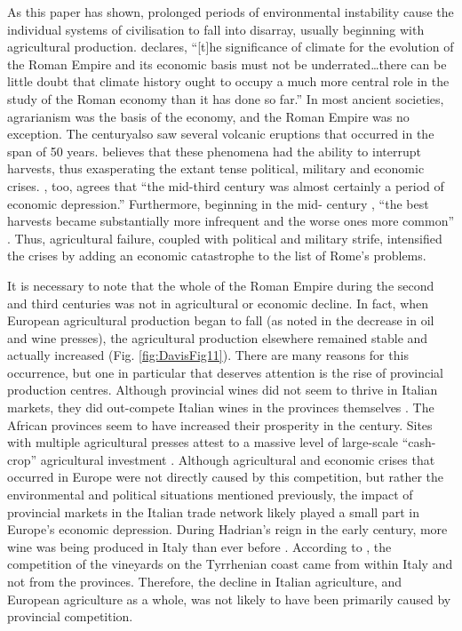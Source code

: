 As this paper has shown, prolonged periods of environmental instability cause the individual systems of civilisation to fall into disarray, usually beginning with agricultural production. \textcite[12]{Scheidel_2012} declares, “[t]he significance of climate for the evolution of the Roman Empire and its economic basis must not be underrated…there can be little doubt that climate history ought to occupy a much more central role in the study of the Roman economy than it has done so far.” In most ancient societies, agrarianism was the basis of the economy, and the Roman Empire was no exception. The  century\AD also saw several volcanic eruptions that occurred in the span of 50 years. \textcite[186]{McCormick_2012} believes that these phenomena had the ability to interrupt harvests, thus exasperating the extant tense political, military and economic crises. \textcite[123]{Hopkins_1980}, too, agrees that “the mid-third century was almost certainly a period of economic depression.” Furthermore, beginning in the mid- century \AD, “the best harvests became substantially more infrequent and the worse ones more common” \parencite[189]{McCormick_2012}. Thus, agricultural failure, coupled with political and military strife, intensified the crises by adding an economic catastrophe to the list of Rome’s problems. 

It is necessary to note that the whole of the Roman Empire during the second and third centuries was not in agricultural or economic decline. In fact, when European agricultural production began to fall (as noted in the decrease in oil and wine presses), the agricultural production elsewhere remained stable and actually increased (Fig. \ref{fig:DavisFig11}). There are many reasons for this occurrence, but one in particular that deserves attention is the rise of provincial production centres. Although provincial wines did not seem to thrive in Italian markets, they did out-compete Italian wines in the provinces themselves \parencite[289]{Woolf_1992}. The African provinces seem to have increased their prosperity in the  century\AD. Sites with multiple agricultural presses attest to a massive level of large-scale “cash-crop” agricultural investment \parencite[19]{Bowman_2013}. Although agricultural and economic crises that occurred in Europe were not directly caused by this competition, but rather the environmental and political situations mentioned previously, the impact of provincial markets in the Italian trade network likely played a small part in Europe’s economic depression. During Hadrian’s reign in the early  century\AD, more wine was being produced in Italy than ever before \parencite[19]{Purcell_1985}. According to \textcite[147]{Tchernia_2006}, the competition of the vineyards on the Tyrrhenian coast came from within Italy and not from the provinces. Therefore, the decline in Italian agriculture, and European agriculture as a whole, was not likely to have been primarily caused by provincial competition.

